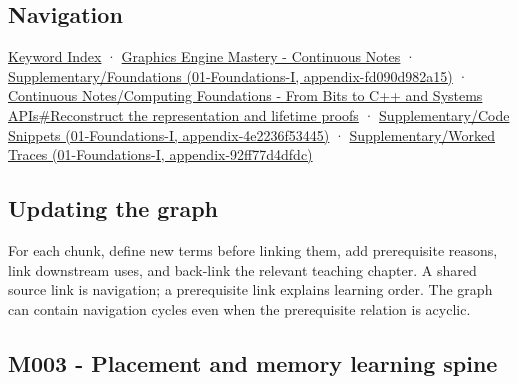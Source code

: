 \subsection{Navigation}\label{appendix-4ad47bdd269a-navigation}

\hyperref[appendix-a6d556a4ef50]{Keyword Index} · \href{Graphics\%20Engine\%20Mastery\%20-\%20Continuous\%20Notes}{Graphics Engine Mastery - Continuous Notes} · \href{../01-Foundations-I/main.pdf\#nameddest=appendix-fd090d982a15}{Supplementary/Foundations (01-Foundations-I, appendix-fd090d982a15)} · \href{Continuous\%20Notes/Computing\%20Foundations\%20-\%20From\%20Bits\%20to\%20C++\%20and\%20Systems\%20APIs\#Reconstruct\%20the\%20representation\%20and\%20lifetime\%20proofs}{Continuous Notes/Computing Foundations - From Bits to C++ and Systems APIs\#Reconstruct the representation and lifetime proofs} · \href{../01-Foundations-I/main.pdf\#nameddest=appendix-4e2236f53445}{Supplementary/Code Snippets (01-Foundations-I, appendix-4e2236f53445)} · \href{../01-Foundations-I/main.pdf\#nameddest=appendix-92ff77d4dfdc}{Supplementary/Worked Traces (01-Foundations-I, appendix-92ff77d4dfdc)}

\subsection{Updating the graph}\label{appendix-4ad47bdd269a-updating-the-graph}

For each chunk, define new terms before linking them, add prerequisite reasons, link downstream uses, and back-link the relevant teaching chapter. A shared source link is navigation; a prerequisite link explains learning order. The graph can contain navigation cycles even when the prerequisite relation is acyclic.

\subsection{M003 - Placement and memory learning spine}\label{appendix-4ad47bdd269a-m003---placement-and-memory-learning-spine}

